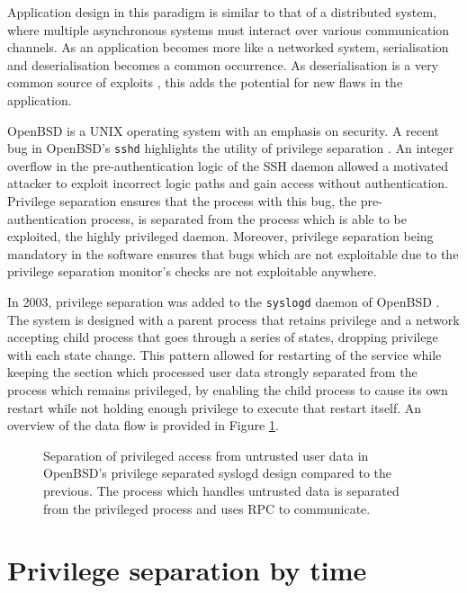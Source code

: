 \documentclass[12pt,a4paper,twoside]{report}
\begin{document}
Application design in this paradigm is similar to that of a distributed system, where multiple asynchronous systems must interact over various communication channels. As an application becomes more like a networked system, serialisation and deserialisation becomes a common occurrence. As deserialisation is a very common source of exploits \citep{the_mitre_corporation_deserialization_2006}, this adds the potential for new flaws in the application.

OpenBSD is a UNIX operating system with an emphasis on security. A recent bug in OpenBSD's \texttt{sshd} highlights the utility of privilege separation \citep{the_openbsd_foundation_openssh_2022}. An integer overflow in the pre-authentication logic of the SSH daemon allowed a motivated attacker to exploit incorrect logic paths and gain access without authentication. Privilege separation ensures that the process with this bug, the pre-authentication process, is separated from the process which is able to be exploited, the highly privileged daemon. Moreover, privilege separation being mandatory in the software ensures that bugs which are not exploitable due to the privilege separation monitor's checks are not exploitable anywhere.

In 2003, privilege separation was added to the \texttt{syslogd} daemon of OpenBSD \citep{madhavapeddy_privsepc_2003}. The system is designed with a parent process that retains privilege and a network accepting child process that goes through a series of states, dropping privilege with each state change. This pattern allowed for restarting of the service while keeping the section which processed user data strongly separated from the process which remains privileged, by enabling the child process to cause its own restart while not holding enough privilege to execute that restart itself. An overview of the data flow is provided in Figure \ref{fig:openbsd-syslogd-privsep}.

\begin{figure}
    \centering
    
    
    \caption{Separation of privileged access from untrusted user data in OpenBSD's privilege separated syslogd design compared to the previous. The process which handles untrusted data is separated from the privileged process and uses RPC to communicate.}
    \label{fig:openbsd-syslogd-privsep}
\end{figure}

\section{Privilege separation by time}
\label{sec:priv-sep-time}
\end{document}
